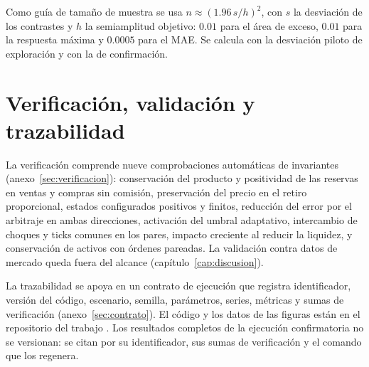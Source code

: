 Como guía de tamaño de muestra se usa $n\approx(1.96\,s/h)^2$, con $s$ la desviación de los contrastes y $h$ la semiamplitud objetivo: $0.01$ para el área de exceso, $0.01$ para la respuesta máxima y $0.0005$ para el MAE. Se calcula con la desviación piloto de exploración y con la de confirmación.

\section{Verificación, validación y trazabilidad}

La verificación comprende nueve comprobaciones automáticas de invariantes (anexo~\ref{sec:verificacion}): conservación del producto y positividad de las reservas en ventas y compras sin comisión, preservación del precio en el retiro proporcional, estados configurados positivos y finitos, reducción del error por el arbitraje en ambas direcciones, activación del umbral adaptativo, intercambio de choques y ticks comunes en los pares, impacto creciente al reducir la liquidez, y conservación de activos con órdenes pareadas. La validación contra datos de mercado queda fuera del alcance (capítulo~\ref{cap:discusion}).

La trazabilidad se apoya en un contrato de ejecución que registra identificador, versión del código, escenario, semilla, parámetros, series, métricas y sumas de verificación (anexo~\ref{sec:contrato}). El código y los datos de las figuras están en el repositorio del trabajo \cite{calderon2026repository}. Los resultados completos de la ejecución confirmatoria no se versionan: se citan por su identificador, sus sumas de verificación y el comando que los regenera.
